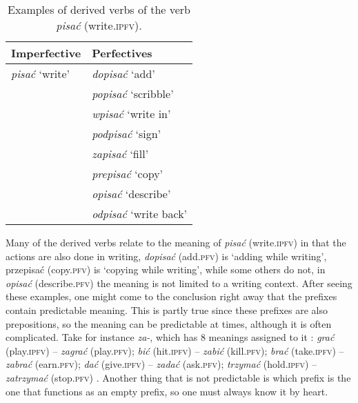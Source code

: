 \documentclass[12pt]{article}
\begin{document}
 \begin{table}[h!]
    \centering
    \small
    \begin{tabular}{p{2.5cm}l}
        \toprule
        \textbf{Imperfective} & \textbf{Perfectives} \\ 
        \midrule
        \textit{pisać} `write' & \textit{dopisać} `add'  \\
         & \textit{popisać} `scribble' 	 \\
         & \textit{wpisać} `write in' 	 \\
         & \textit{podpisać} `sign' \\
         & \textit{zapisać} `fill' \\
         & \textit{prepisać} `copy' \\
         & \textit{opisać} `describe' \\
         & \textit{odpisać} `write back' \\
        \bottomrule
    \end{tabular}
    \caption{Examples of derived verbs of the verb \textit{pisać} (write.\textsc{ipfv}).}
    \label{tab:derived-pisac}
\end{table}


Many of the derived verbs relate to the meaning of \textit{pisać} (write.\textsc{ipfv}) in that the actions are also done in writing, \textit{dopisać} (add.\textsc{pfv}) is `adding while writing', przepisać (copy.\textsc{pfv}) is `copying while writing',  while some others do not, in \textit{opisać} (describe.\textsc{pfv}) the meaning is not limited to a writing context. 
After seeing these examples, one might come to the conclusion right away that the prefixes contain predictable meaning. This is partly true since these prefixes are also prepositions, so the meaning can be predictable at times, although it is often complicated. Take for instance \textit{za-}, which has 8 meanings assigned to it \parencite[Śmiech, 1986, as cited in][]{kita2017WybieramGramatykeDla}: \textit{grać} (play.\textsc{ipfv}) -- \textit{zagrać} (play.\textsc{pfv}); \textit{bić} (hit.\textsc{ipfv}) -- \textit{zabić} (kill.\textsc{pfv}); \textit{brać} (take.\textsc{ipfv}) -- \textit{zabrać} (earn.\textsc{pfv}); \textit{dać} (give.\textsc{ipfv}) -- \textit{zadać} (ask.\textsc{pfv}); \textit{trzymać} (hold.\textsc{ipfv}) -- \textit{zatrzymać} (stop.\textsc{pfv}) \parencite{perlin2005IleJestAspektow}. Another thing that is not predictable is which prefix is the one that functions as an empty prefix, so one must always know it by heart.
\end{document}
